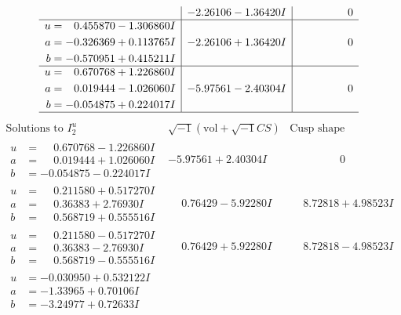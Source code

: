\documentclass[1p]{elsarticle_modified}
\theoremstyle{definition}
\newcommand{\I}{\sqrt{-1}}
\begin{document}
$$\begin{array}{c|c|c}
 & -2.26106 - 1.36420 I & \phantom{-0.000000 } 0 \\ \hline\begin{aligned}
u &= \phantom{-}0.455870 - 1.306860 I \\
a &= -0.326369 + 0.113765 I \\
b &= -0.570951 + 0.415211 I\end{aligned}
 & -2.26106 + 1.36420 I & \phantom{-0.000000 } 0 \\ \hline\begin{aligned}
u &= \phantom{-}0.670768 + 1.226860 I \\
a &= \phantom{-}0.019444 - 1.026060 I \\
b &= -0.054875 + 0.224017 I\end{aligned}
 & -5.97561 - 2.40304 I & \phantom{-0.000000 } 0\\
 \hline 
 \end{array}$$\newpage$$\begin{array}{c|c|c}  
\text{Solutions to }I^u_{2}& \I (\text{vol} + \sqrt{-1}CS) & \text{Cusp shape}\\
 \hline 
\begin{aligned}
u &= \phantom{-}0.670768 - 1.226860 I \\
a &= \phantom{-}0.019444 + 1.026060 I \\
b &= -0.054875 - 0.224017 I\end{aligned}
 & -5.97561 + 2.40304 I & \phantom{-0.000000 } 0 \\ \hline\begin{aligned}
u &= \phantom{-}0.211580 + 0.517270 I \\
a &= \phantom{-}0.36383 + 2.76930 I \\
b &= \phantom{-}0.568719 + 0.555516 I\end{aligned}
 & \phantom{-}0.76429 - 5.92280 I & \phantom{-}8.72818 + 4.98523 I \\ \hline\begin{aligned}
u &= \phantom{-}0.211580 - 0.517270 I \\
a &= \phantom{-}0.36383 - 2.76930 I \\
b &= \phantom{-}0.568719 - 0.555516 I\end{aligned}
 & \phantom{-}0.76429 + 5.92280 I & \phantom{-}8.72818 - 4.98523 I \\ \hline\begin{aligned}
u &= -0.030950 + 0.532122 I \\
a &= -1.33965 + 0.70106 I \\
b &= -3.24977 + 0.72633 I\end{aligned}

\end{array}$$
\end{document}
